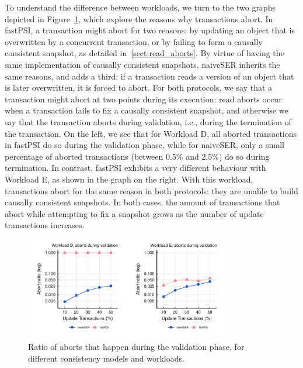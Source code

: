 To understand the difference between workloads, we turn to the two graphs depicted in Figure~\ref{fig:raw_abort_rate_2pc}, which explore the reasons why transactions abort. In fastPSI, a transaction might abort for two reasons: by updating an object that is overwritten by a concurrent transaction, or by failing to form a causally consistent snapshot, as detailed in~\ref{sect:read_aborts}. By virtue of having the same implementation of causally consistent snapshots, naiveSER inherits the same reasons, and adds a third: if a transaction reads a version of an object that is later overwritten, it is forced to abort. For both protocols, we say that a transaction might abort at two points during its execution: read aborts occur when a transaction fails to fix a causally consistent snapshot, and otherwise we say that the transaction aborts during validation, i.e., during the termination of the transaction. On the left, we see that for Workload D, all aborted transactions in fastPSI do so during the validation phase, while for naiveSER, only a small percentage of aborted transactions (between 0.5\% and 2.5\%) do so during termination. In contrast, fastPSI exhibits a very different behaviour with Workload E, as shown in the graph on the right. With this workload, transactions abort for the same reason in both protocols: they are unable to build causally consistent snapshots. In both cases, the amount of transactions that abort while attempting to fix a snapshot grows as the number of update transactions increases.

\begin{figure}[t]
\begin{center}
\includegraphics[width=0.8\textwidth]{figures/abort_rate_bench_2pc.pdf}
\vspace{-0.75cm}
\end{center}
\caption{Ratio of aborts that happen during the validation phase, for different consistency models and workloads.}
\label{fig:raw_abort_rate_2pc}
\end{figure}

